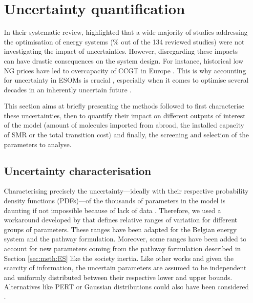 \section{Uncertainty quantification}
\label{sec:meth:UQ}
In their systematic review, \citet{yue2018review} highlighted that a wide majority of studies addressing the optimisation of energy systems (\% out of the 134 reviewed studies) were not investigating the impact of uncertainties. However, disregarding these impacts can have drastic consequences on the system design. For instance, historical low \gls{NG} prices have led to overcapacity of \gls{CCGT} in Europe \cite{moret2020overcapacity}. This is why accounting for uncertainty in \gls{ESOMs} is crucial \cite{mavromatidis2018uncertainty}, especially when it comes to optimise several decades in an inherently uncertain future \cite{peace2008insights}.

This section aims at briefly presenting the methods followed to first characterise these uncertainties, then to quantify their impact on different outputs of interest of the model (\eg amount of molecules imported from abroad, the installed capacity of \gls{SMR} or the total transition cost) and finally, the screening and selection of the parameters to analyse.

\subsection{Uncertainty characterisation}
\label{subsec:uncert_charac}
Characterising precisely the uncertainty---ideally with their respective probability density functions (PDFs)---of the thousands of parameters in the model is daunting if not impossible because of lack of data \cite{marnay2006addressing}. Therefore, we used a workaround developed by \citet{Moret2017} that defines relative ranges of variation for different groups of parameters. These ranges have been adapted for the Belgian energy system and the pathway formulation. Moreover, some ranges have been added to account for new parameters coming from the pathway formulation described in Section \ref{sec:meth:ES} like the society inertia. Like other works \cite{li2019renewables,coppitters2021robust} and given the scarcity of information, the uncertain parameters are assumed to be independent and uniformly distributed between their respective lower and upper bounds. Alternatives like PERT or Gaussian distributions could also have been considered \cite{coppittersthesis}.

